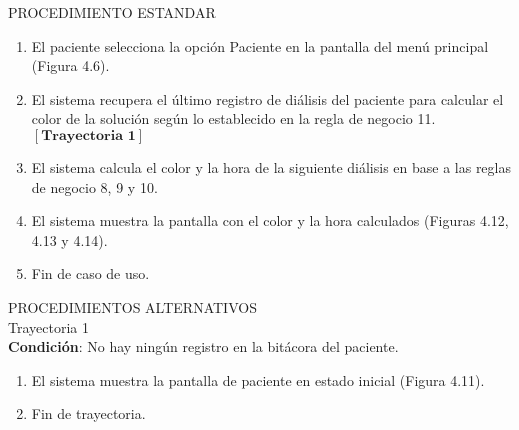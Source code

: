 \vspace*{1cm}
\Large{PROCEDIMIENTO ESTANDAR}
\large{}
\begin{enumerate}
\item El paciente selecciona la opción Paciente en la pantalla del menú principal (Figura 4.6).
		\item El sistema recupera el último registro de diálisis del paciente para calcular el color de la solución según lo establecido en la regla de negocio 11. $\left[\textbf{Trayectoria 1}\right]$
		\item El sistema calcula el color y la hora de la siguiente diálisis en base a las reglas de negocio 8, 9 y 10. 
		\item El sistema muestra la pantalla con el color y la hora calculados (Figuras 4.12, 4.13 y 4.14).
		\item Fin de caso de uso.
\end{enumerate}
\newpage
\Large{PROCEDIMIENTOS ALTERNATIVOS}\\
\large{Trayectoria 1}\\
\textbf{Condición}: No hay ningún registro en la bitácora del paciente.
\begin{enumerate}
		\item El sistema muestra la pantalla de paciente en estado inicial (Figura 4.11).
		\item Fin de trayectoria.
\end{enumerate}